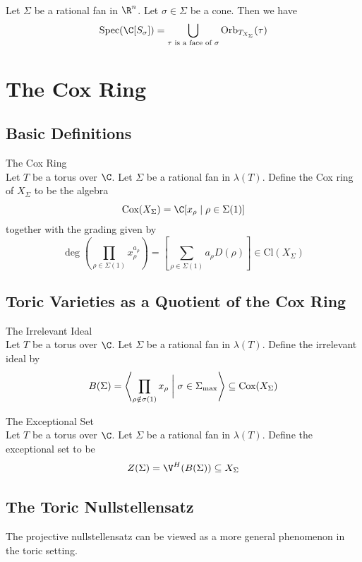 \documentclass[a4paper]{article}
\begin{document}
\begin{prp}{}{}\\
Let $\Sigma$ be a rational fan in $\R^n$. Let $\sigma\in\Sigma$ be a cone. Then we have $$\text{Spec}(\C[S_\sigma])=\bigcup_{\tau\text{ is a face of }\sigma}\text{Orb}_{T_{X_\Sigma}}(\tau)$$
\end{prp}

\pagebreak
\section{The Cox Ring}
\subsection{Basic Definitions}
\begin{defn}{The Cox Ring}{}\\
Let $T$ be a torus over $\C$. Let $\Sigma$ be a rational fan in $\lambda(T)$. Define the Cox ring of $X_\Sigma$ to be the algebra $$\text{Cox}(X_\Sigma)=\C[x_\rho\;|\;\rho\in\Sigma(1)]$$ together with the grading given by $$\deg\left(\prod_{\rho\in\Sigma(1)}x_\rho^{a_\rho}\right)=\left[\sum_{\rho\in\Sigma(1)}a_\rho D(\rho)\right]\in\text{Cl}(X_\Sigma)$$
\end{defn}

\subsection{Toric Varieties as a Quotient of the Cox Ring}

\begin{defn}{The Irrelevant Ideal}{}\\
Let $T$ be a torus over $\C$. Let $\Sigma$ be a rational fan in $\lambda(T)$. Define the irrelevant ideal by $$B(\Sigma)=\left\langle\prod_{\rho\notin\sigma(1)}x_\rho\;\bigg{|}\;\sigma\in\Sigma_\text{max}\right\rangle\subseteq\text{Cox}(X_\Sigma)$$
\end{defn}

\begin{defn}{The Exceptional Set}{}\\
Let $T$ be a torus over $\C$. Let $\Sigma$ be a rational fan in $\lambda(T)$. Define the exceptional set to be $$Z(\Sigma)=\V^H(B(\Sigma))\subseteq X_\Sigma$$
\end{defn}


\subsection{The Toric Nullstellensatz}
The projective nullstellensatz can be viewed as a more general phenomenon in the toric setting. 
\end{document}
